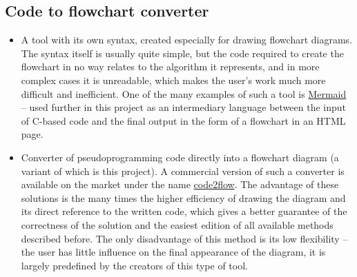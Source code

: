 	\subsection{Code to flowchart converter} 	
	\begin{itemize}
	\item
	A tool with its own syntax, created especially for drawing flowchart diagrams. The syntax itself is usually quite simple, but the code required to create the flowchart in no way relates to the algorithm it represents, and in more complex cases it is unreadable, which makes the user's work much more difficult and inefficient. One of the many examples of such a tool is \href{https://mermaid-js.github.io/mermaid/#/}{Mermaid} -- used further in this project as an intermediary language between the input of C-based code and the final output in the form of a flowchart in an HTML page.
	
	\item
	Converter of pseudoprogramming code directly into a flowchart diagram (a variant of which is this project). A commercial version of such a converter is available on the market under the name \href{https://code2flow.com}{code2flow}. The advantage of these solutions is the many times the higher efficiency of drawing the diagram and its direct reference to the written code, which gives a better guarantee of the correctness of the solution and the easiest edition of all available methods described before. The only disadvantage of this method is its low flexibility -- the user has little influence on the final appearance of the diagram, it is largely predefined by the creators of this type of tool.
	\end{itemize}
	
